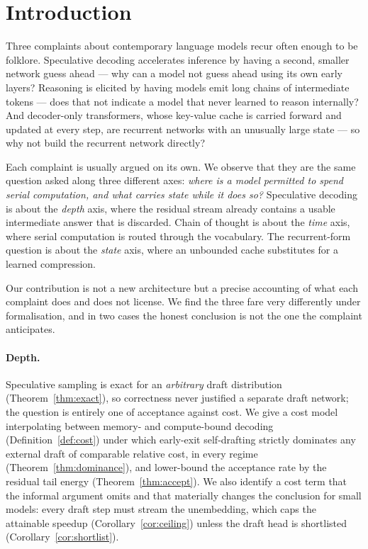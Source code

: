 \section{Introduction}
\label{sec:intro}

Three complaints about contemporary language models recur often enough to be
folklore. Speculative decoding \cite{leviathan2023,chen2023} accelerates
inference by having a second, smaller network guess ahead --- why can a model not
guess ahead using its own early layers? Reasoning is elicited by having models
emit long chains of intermediate tokens --- does that not indicate a model that
never learned to reason internally? And decoder-only transformers, whose
key-value cache is carried forward and updated at every step, are recurrent
networks with an unusually large state --- so why not build the recurrent network
directly?

Each complaint is usually argued on its own. We observe that they are the same
question asked along three different axes: \emph{where is a model permitted to
spend serial computation, and what carries state while it does so?}
Speculative decoding is about the \emph{depth} axis, where the residual stream
already contains a usable intermediate answer that is discarded. Chain of
thought is about the \emph{time} axis, where serial computation is routed
through the vocabulary. The recurrent-form question is about the \emph{state}
axis, where an unbounded cache substitutes for a learned compression.

Our contribution is not a new architecture but a precise accounting of what each
complaint does and does not license. We find the three fare very differently
under formalisation, and in two cases the honest conclusion is not the one the
complaint anticipates.

\paragraph{Depth.} Speculative sampling is exact for an \emph{arbitrary} draft
distribution (Theorem~\ref{thm:exact}), so correctness never justified a separate
draft network; the question is entirely one of acceptance against cost. We give a
cost model interpolating between memory- and compute-bound decoding
(Definition~\ref{def:cost}) under which early-exit self-drafting strictly
dominates any external draft of comparable relative cost, in every regime
(Theorem~\ref{thm:dominance}), and lower-bound the acceptance rate by the
residual tail energy (Theorem~\ref{thm:accept}). We also identify a cost term
that the informal argument omits and that materially changes the conclusion for
small models: every draft step must stream the unembedding, which caps the
attainable speedup (Corollary~\ref{cor:ceiling}) unless the draft head is
shortlisted (Corollary~\ref{cor:shortlist}).

